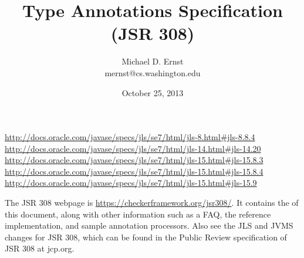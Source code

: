 \documentclass[10pt]{article}
\date{October 25, 2013}
\title{Type Annotations Specification (JSR 308)}
\author{Michael D. Ernst \\
{\ttfamily mernst@cs.washington.edu}
}
\begin{document}
\def\codesize{\smaller}
\newcommand{\code}[1]{{\ifmmode{\mbox{\codesize\ttfamily{#1}}}\else{\codesize\ttfamily #1}\fi}}
\def\<#1>{\code{#1}}
\newcommand{\codesmall}[1]{\ifmmode{\mbox{\small\ttfamily{#1}}}\else{\small\ttfamily #1}\fi}
\newcommand{\codefootnotesize}[1]{\ifmmode{\mbox{\footnotesize\ttfamily{#1}}}\else{\footnotesize\ttfamily #1}\fi}
\newcommand{\myurl}[1]{{\codesize\url{#1}}}





\makeatletter
\def\topfigrule{\kern3\p@ \hrule \kern -3.4\p@} %
\def\botfigrule{\kern-3\p@ \hrule \kern 2.6\p@} %
\def\dblfigrule{\kern3\p@ \hrule \kern -3.4\p@} %
\makeatother


\urldef{\jlsEightEightFour}\url{http://docs.oracle.com/javase/specs/jls/se7/html/jls-8.html#jls-8.8.4}
\urldef{\jlsFourteenTwenty}\url{http://docs.oracle.com/javase/specs/jls/se7/html/jls-14.html#jls-14.20}
\urldef{\jlsFifteenEightThree}\url{http://docs.oracle.com/javase/specs/jls/se7/html/jls-15.html#jls-15.8.3}
\urldef{\jlsFifteenEightFour}\url{http://docs.oracle.com/javase/specs/jls/se7/html/jls-15.html#jls-15.8.4}
\urldef{\jlsFifteenNine}\url{http://docs.oracle.com/javase/specs/jls/se7/html/jls-15.html#jls-15.9}



\maketitle

The JSR 308 webpage is \myurl{https://checkerframework.org/jsr308/}.
It contains the
of this document, along
with other information such as a FAQ, the reference implementation, and
sample annotation processors.
Also see the JLS and JVMS changes for JSR 308, which can be found in
the Public Review specification of JSR 308 at jcp.org.
\end{document}
